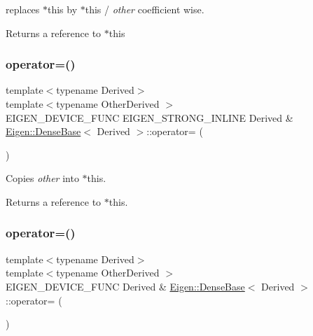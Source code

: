 replaces {\ttfamily $\ast$this} by {\ttfamily $\ast$this} / {\itshape other} coefficient wise.

\begin{DoxyReturn}{Returns}
a reference to {\ttfamily $\ast$this} 
\end{DoxyReturn}
\mbox{\label{class_eigen_1_1_array_base_a581a7a353bd007b5352f11688e3bc5fa}} 
\subsubsection{\texorpdfstring{operator=()}{operator=()}\hspace{0.1cm}{\footnotesize\ttfamily [1/5]}}
{\footnotesize\ttfamily template$<$typename Derived$>$ \\
template$<$typename Other\+Derived $>$ \\
E\+I\+G\+E\+N\+\_\+\+D\+E\+V\+I\+C\+E\+\_\+\+F\+U\+NC E\+I\+G\+E\+N\+\_\+\+S\+T\+R\+O\+N\+G\+\_\+\+I\+N\+L\+I\+NE Derived \& \mbox{\hyperlink{class_eigen_1_1_dense_base}{Eigen\+::\+Dense\+Base}}$<$ Derived $>$\+::operator= (\begin{DoxyParamCaption}\item[{typename Other\+Derived}]{ }\end{DoxyParamCaption})}

Copies {\itshape other} into $\ast$this. \begin{DoxyReturn}{Returns}
a reference to $\ast$this. 
\end{DoxyReturn}
\mbox{\label{class_eigen_1_1_array_base_a6462697d5a6fa3104f5f1213fdf9ff12}} 
\subsubsection{\texorpdfstring{operator=()}{operator=()}\hspace{0.1cm}{\footnotesize\ttfamily [2/5]}}
{\footnotesize\ttfamily template$<$typename Derived$>$ \\
template$<$typename Other\+Derived $>$ \\
E\+I\+G\+E\+N\+\_\+\+D\+E\+V\+I\+C\+E\+\_\+\+F\+U\+NC Derived \& \mbox{\hyperlink{class_eigen_1_1_dense_base}{Eigen\+::\+Dense\+Base}}$<$ Derived $>$\+::operator= (\begin{DoxyParamCaption}\item[{typename Other\+Derived}]{ }\end{DoxyParamCaption})}



